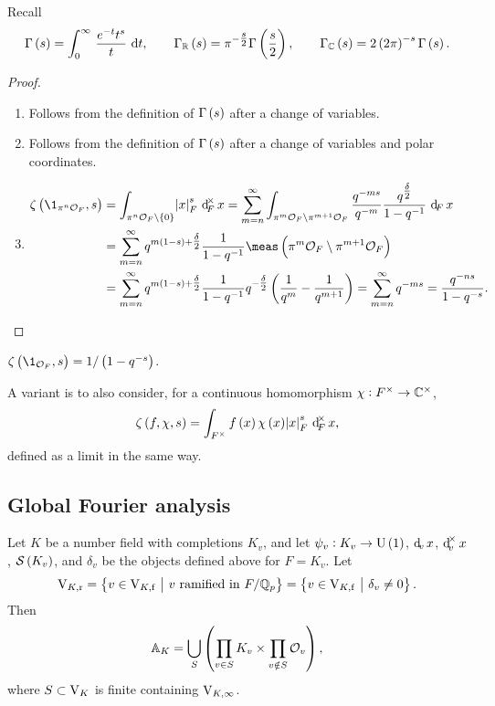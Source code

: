 Recall
$$ \Gamma\br{s} = \intd{0}{\infty}{\dfrac{e^{-t}t^s}{t}}{t}, \qquad \Gamma_\RR\br{s} = \pi^{-\tfrac{s}{2}}\Gamma\br{\dfrac{s}{2}}, \qquad \Gamma_\CC\br{s} = 2\br{2\pi}^{-s}\Gamma\br{s}. $$

\begin{proof}
\hfill
\begin{enumerate}
\item Follows from the definition of $ \Gamma\br{s} $ after a change of variables.
\item Follows from the definition of $ \Gamma\br{s} $ after a change of variables and polar coordinates.

\pagebreak

\item
\begin{align*}
\zeta\br{\1_{\pi^n\OOO_F}, s}
& = \intFX[\pi^n\OOO_F \setminus \cbr{0}]{\abs{x}_F^s}{x}
= \sum_{m = n}^\infty \intF[\pi^m\OOO_F \setminus \pi^{m + 1}\OOO_F]{\dfrac{q^{-ms}}{q^{-m}}\dfrac{q^{\tfrac{\delta}{2}}}{1 - q^{-1}}}{x} \\
& = \sum_{m = n}^\infty q^{m\br{1 - s} + \tfrac{\delta}{2}}\dfrac{1}{1 - q^{-1}}\meas\br{\pi^m\OOO_F \setminus \pi^{m + 1}\OOO_F} \\
& = \sum_{m = n}^\infty q^{m\br{1 - s} + \tfrac{\delta}{2}}\dfrac{1}{1 - q^{-1}}q^{-\tfrac{\delta}{2}}\br{\dfrac{1}{q^m} - \dfrac{1}{q^{m + 1}}}
= \sum_{m = n}^\infty q^{-ms}
= \dfrac{q^{-ns}}{1 - q^{-s}}.
\end{align*}
\end{enumerate}
\end{proof}

\begin{example*}
$ \zeta\br{\1_{\OOO_F}, s} = 1 / \br{1 - q^{-s}} $.
\end{example*}

A variant is to also consider, for a continuous homomorphism $ \chi : F^\times \to \mathbb{C}^\times $,
$$ \zeta\br{f, \chi, s} = \intFX{f\br{x}\chi\br{x}\abs{x}_F^s}{x}, $$
defined as a limit in the same way.

\subsection{Global Fourier analysis}

Let $ K $ be a number field with completions $ K_v $, and let $ \psi_v : K_v \to \U\br{1} $, $ \dv x $, $ \dv^\times x $, $ \SSS\br{K_v} $, and $ \delta_v $ be the objects defined above for $ F = K_v $. Let
$$ \V_{K, \r} = \cbr{v \in \V_{K, \f} \st v \ \text{ramified in} \ F / \QQ_p} = \cbr{v \in \V_{K, \f} \st \delta_v \ne 0}. $$
Then
$$ \AA_K = \bigcup_S \br{\prod_{v \in S} K_v \times \prod_{v \notin S} \OOO_v}, $$
where $ S \subset \mathrm{V}_K $ is finite containing $ \mathrm{V}_{K, \infty} $.


